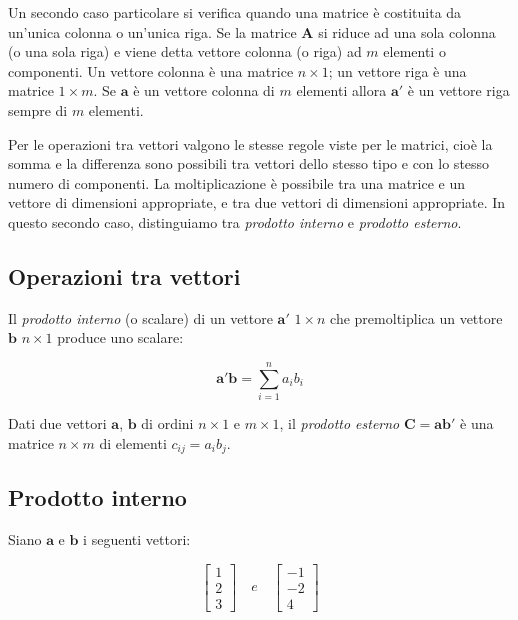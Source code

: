 \documentclass[
  11pt,
]{krantz}
\theoremstyle{definition}
\theoremstyle{definition}
\theoremstyle{definition}
\theoremstyle{definition}
\theoremstyle{remark}
\begin{document}
Un secondo caso particolare si verifica quando una matrice è costituita da un'unica colonna o un'unica riga. Se la matrice \(\boldsymbol{A}\) si riduce ad una sola colonna (o una sola riga) e viene detta vettore colonna (o riga) ad \(m\) elementi o componenti. Un vettore colonna è una matrice \(n \times 1\); un vettore riga è una matrice \(1 \times m\). Se \(\boldsymbol{a}\) è un vettore colonna di \(m\) elementi allora \(\boldsymbol{a}'\) è un vettore riga sempre di \(m\) elementi.

Per le operazioni tra vettori valgono le stesse regole viste per le matrici, cioè la somma e la differenza sono possibili tra vettori dello stesso tipo e con lo stesso numero di componenti. La moltiplicazione è possibile tra una matrice e un vettore di dimensioni appropriate, e tra due vettori di dimensioni appropriate. In questo secondo caso, distinguiamo tra \emph{prodotto interno} e \emph{prodotto esterno}.

\hypertarget{operazioni-tra-vettori}{%
\subsection{Operazioni tra vettori}\label{operazioni-tra-vettori}}

Il \emph{prodotto interno} (o scalare) di un vettore \(\boldsymbol{a}'\) \(1 \times n\) che premoltiplica un vettore \(\boldsymbol{b}\) \(n \times 1\) produce uno scalare:

\[\boldsymbol{a}'\boldsymbol{b} = \sum_{i=1}^{n}a_i b_i\]

Dati due vettori \(\boldsymbol{a}\), \(\boldsymbol{b}\) di ordini \(n \times 1\) e \(m \times 1\), il \emph{prodotto esterno} \(\boldsymbol{C} = \boldsymbol{ab}'\) è una matrice \(n \times m\) di elementi \(c_{ij} = a_i b_j\).

\hypertarget{prodotto-interno}{%
\subsection{Prodotto interno}\label{prodotto-interno}}

Siano \(\boldsymbol{a}\) e \(\boldsymbol{b}\) i seguenti vettori:

\[\left[ \begin{array}{c}
1 \\
2 \\
3
\end{array}
 \right] \quad e \quad
\left[ \begin{array}{c}
-1 \\
-2 \\
4
\end{array}
 \right]\]
\end{document}
